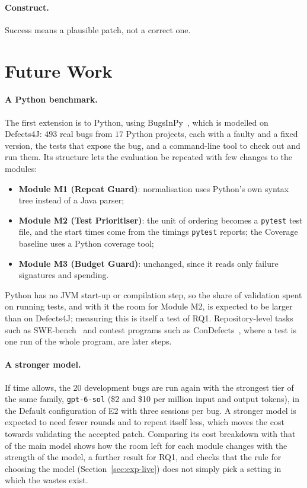 \paragraph{Construct.} Success means a plausible patch, not a correct one.

\section{Future Work}
\label{sec:plan-future}

\paragraph{A Python benchmark.} The first extension is to Python, using
BugsInPy~\citep{widyasari2020bugsinpy}, which is modelled on Defects4J: $493$
real bugs from $17$ Python projects, each with a faulty and a fixed version, the
tests that expose the bug, and a command-line tool to check out and run them.
Its structure lets the evaluation be repeated with few changes to the modules:
\begin{itemize}[leftmargin=*,itemsep=2pt]
\item \textbf{Module M1 (Repeat Guard)}: normalisation uses Python's own syntax
tree instead of a Java parser;
\item \textbf{Module M2 (Test Prioritiser)}: the unit of ordering becomes a
\texttt{pytest} test file, and the start times come from the timings
\texttt{pytest} reports; the Coverage baseline uses a Python coverage tool;
\item \textbf{Module M3 (Budget Guard)}: unchanged, since it reads only
failure signatures and spending.
\end{itemize}
Python has no JVM start-up or compilation step, so the share of validation
spent on running tests, and with it the room for Module M2, is expected to be
larger than on Defects4J; measuring this is itself a test of RQ1. Repository-level
tasks such as SWE-bench~\citep{jimenez2024swebench} and contest programs such
as ConDefects~\citep{wu2024condefects}, where a test is one run of the whole
program, are later steps.

\paragraph{A stronger model.} If time allows, the $20$ development bugs are
run again with the strongest tier of the same family, \texttt{gpt-6-sol}
(\$2 and \$10 per million input and output tokens), in the Default
configuration of E2 with three sessions per bug. A stronger model is expected
to need fewer rounds and to repeat itself less, which moves the cost towards
validating the accepted patch. Comparing its cost breakdown with that of the
main model shows how the room left for each module changes with the strength of
the model, a further result for RQ1, and checks that the rule for choosing the
model (Section~\ref{sec:exp-live}) does not simply pick a setting in which
the wastes exist.

